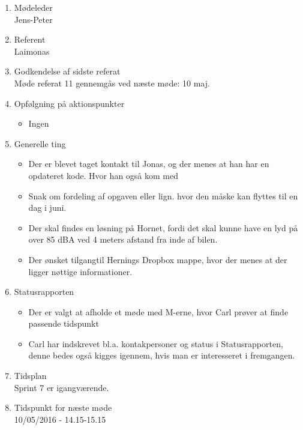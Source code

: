 	\begin{enumerate}
		\itemsep 0.3em 
		\item Mødeleder\\
			Jens-Peter
		\item Referent\\
			Laimonas
		\item Godkendelse af sidste referat\\
			Møde referat 11 gennemgås ved næste møde: 10 maj. 

		\item Opfølgning på aktionspunkter
		\begin{itemize}
			\itemsep 0.3em 
			\item Ingen
		\end{itemize}
		
		\item Generelle ting
			\begin{itemize}
					
				\item Der er blevet taget kontakt til Jonas, og der menes at han har en opdateret kode. Hvor han også kom med 
				
				\item Snak om fordeling af opgaven eller lign. hvor den måske kan flyttes til en dag i juni. 
				
				\item Der skal findes en løsning på Hornet, fordi det skal kunne have en lyd på over 85 dBA ved 4 meters afstand fra inde af bilen. 
				
				\item Der ønsket tilgangtil Hernings Dropbox mappe, hvor der menes at der ligger nøttige informationer. 
				
			\end{itemize}
			
			
		\item Statusrapporten
				
			\begin{itemize}
				\item Der er valgt at afholde et møde med M-erne, hvor Carl prøver at finde passende tidspunkt
					
				\item Carl har indskrevet bl.a. kontakpersoner og status i Statusrapporten, denne bedes også kigges igennem, hvis man er interesseret i fremgangen. 
					
			\end{itemize}
		
		\item Tidsplan\\
			Sprint 7 er igangværende. 

		\item Tidspunkt for næste møde\\
			10/05/2016 - 14.15-15.15
	\end{enumerate}
